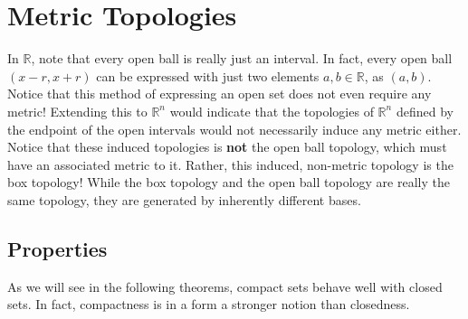\section{Metric Topologies}

  In $\mathbb{R}$, note that every open ball is really just an interval. In fact, every open ball $(x - r, x + r)$ can be expressed with just two elements $a, b \in \mathbb{R}$, as $(a, b)$. Notice that this method of expressing an open set does not even require any metric! Extending this to $\mathbb{R}^n$ would indicate that the topologies of $\mathbb{R}^n$ defined by the endpoint of the open intervals would not necessarily induce any metric either. Notice that these induced topologies is \textbf{not} the open ball topology, which must have an associated metric to it. Rather, this induced, non-metric topology is the box topology! While the box topology and the open ball topology are really the same topology, they are generated by inherently different bases. 

\subsection{Properties} 

  As we will see in the following theorems, compact sets behave well with closed sets. In fact, compactness is in a form a stronger notion than closedness. 

